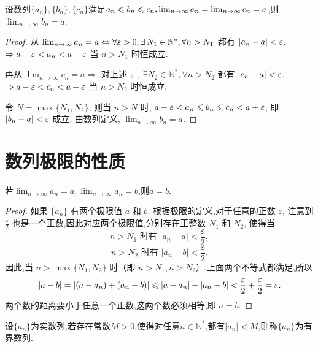\begin{theorem}[夹逼准则]\label{thm:squeeze_theorem}
    设数列$\{a_n\},\{b_n\},\{c_n\}$满足$a_n\leqslant b_n\leqslant c_n, \lim_{n \to \infty} a_n=\lim_{n \to \infty} c_n=a$,则$\lim_{n \to \infty} b_n=a$.
\end{theorem}

\begin{proof}
    从 $\lim_{n \to \infty} a_n = a \Leftrightarrow \forall \ve >0, \exists N_1\in \mathbb{N}^*, \forall n>N_1$ 都有 $|a_n-a|<\varepsilon$. $ \Rightarrow a-\varepsilon<a_n<a+\varepsilon$ 当 $n>N_1$ 时恒成立.

    再从 $\lim_{n \to \infty} c_n = a \Rightarrow $ 对上述 $\varepsilon$ , $\exists N_2\in \mathbb{N}^*, \forall n>N_2$ 都有 $|c_n-a|<\varepsilon$. $ \Rightarrow a-\varepsilon<c_n<a+\varepsilon$ 当 $n>N_2$ 时恒成立.

    令 $N=\max\{N_1,N_2\}$, 则当 $n>N$ 时, $a-\varepsilon<a_n\leqslant b_n\leqslant c_n<a+\varepsilon$, 即 $|b_n-a|<\varepsilon$ 成立. 由数列定义, $\lim_{n \to \infty} b_n=a$.
\end{proof}

\section{数列极限的性质}

\begin{proposition}[唯一性]
    若$\lim_{n \to \infty} a_n=a, \lim_{n \to \infty} a_n=b$,则$a=b$.
\end{proposition}

\begin{proof}
    如果 $\{a_n\}$ 有两个极限值 $a$ 和 $b$. 根据极限的定义,对于任意的正数 $\varepsilon$, 注意到 $\frac{\varepsilon}{2}$ 也是一个正数,因此对应两个极限值,分别存在正整数 $N_1$ 和 $N_2$, 使得当
    $$
        n > N_1 \text{ 时有 } |a_n - a| < \frac{\varepsilon}{2},
    $$
    $$
        n > N_2 \text{ 时有 } |a_n - b| < \frac{\varepsilon}{2}.
    $$
    因此,当 $n > \max \{N_1, N_2\}$ 时（即 $n > N_1, n > N_2$）,上面两个不等式都满足,所以
    $$
        |a - b| = |(a - a_n) + (a_n - b)| \leqslant |a - a_n| + |a_n - b| < \frac{\varepsilon}{2} + \frac{\varepsilon}{2} = \varepsilon.
    $$
    两个数的距离要小于任意一个正数,这两个数必须相等,即 $a = b$.
\end{proof}

\begin{definition}
    [数列有界] 设$\{a_n\}$为实数列,若存在常数$M > 0$,使得对任意$n \in \mathbb{N}^*$,都有$|a_n| < M$,则称$\{a_n\}$为有界数列.
\end{definition}

